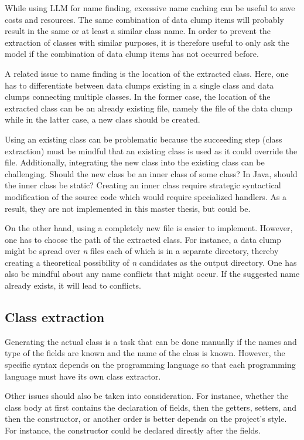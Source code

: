 While using \acs{LLM} for name finding, excessive name caching can be useful to save costs and resources. The same combination of data clump items will probably result in the same or at least a similar class name. In order to prevent the extraction of classes with similar purposes, it is therefore useful to only ask the model if the combination of data clump items has not occurred before. 

A related issue to name finding is the location of the extracted class. Here, one has to differentiate  between data clumps existing in a single class and data clumps connecting multiple classes. In the former case, the location of the extracted class can be an already existing file, namely the file of the data clump  while in the latter case, a new class should be created.

Using an existing class can be problematic because the succeeding step (class extraction) must be mindful that an existing class is used as it could override the file. Additionally, integrating the new class into the existing class can be challenging. Should the new class be an inner class of some class? In Java, should the inner class be static?  Creating an inner class require strategic syntactical modification of the source code which would require specialized handlers. As a result, they are not implemented in this master thesis, but could be. 

On the other hand, using a completely new file is easier to implement. However, one has to choose the path of the extracted class. For instance, a data clump might be spread over \textit{n} files each of which is in a separate directory, thereby creating a theoretical possibility of \textit{n} candidates as the output directory. 
One has also be mindful about any name conflicts that might occur. If the suggested name already exists, it will lead to conflicts.


\subsection{Class extraction}

Generating the actual class is a task that can be done manually if the names and type of the fields are known and the name of the class is known. However, the specific syntax depends on the programming language so that each programming language must have its own class extractor.

Other issues should also be taken into consideration. For instance, whether the class body at first contains the declaration of fields, then the getters, setters, and then the constructor, or another order is better depends on the project's style. For instance, the constructor could be declared directly after the fields.

